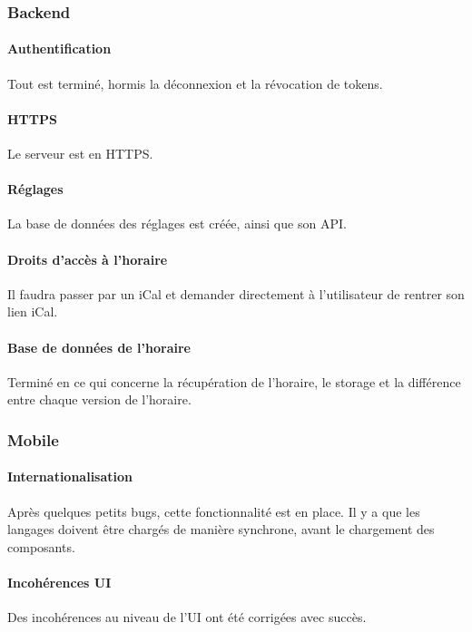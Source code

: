 \subsubsection{Backend}

	\paragraph{Authentification} Tout est terminé, hormis la déconnexion et la révocation de tokens.
	
	\paragraph{HTTPS} Le serveur est en HTTPS.
	
	\paragraph{Réglages} La base de données des réglages est créée, ainsi que son API.
	
	\paragraph{Droits d'accès à l'horaire} Il faudra passer par un iCal et demander directement à l'utilisateur de rentrer son lien iCal. \rWalley
	
	\paragraph{Base de données de l'horaire} Terminé en ce qui concerne la récupération de l'horaire, le storage et la différence entre chaque version de l'horaire.
	
\subsubsection{Mobile}

	\paragraph{Internationalisation} Après quelques petits bugs, cette fonctionnalité est en place. Il y a que les langages doivent être chargés de manière synchrone, avant le chargement des composants.
	
	\paragraph{Incohérences UI} Des incohérences au niveau de l'UI ont été corrigées avec succès. 
	
